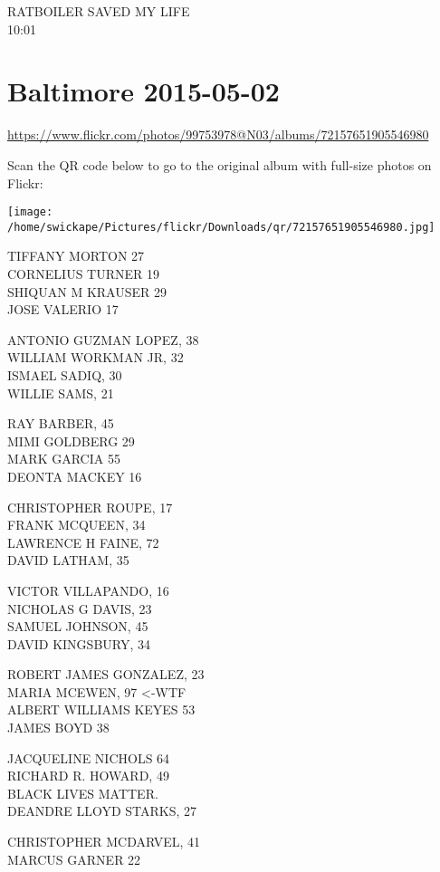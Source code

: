 \documentclass[10pt,letterpaper]{article}
\begin{document}
RATBOILER SAVED MY LIFE\\
10:01
\pagebreak

\section*{Baltimore 2015-05-02}

\url{https://www.flickr.com/photos/99753978@N03/albums/72157651905546980}

Scan the QR code below to go to the original album with full-size photos on Flickr:

\texttt{[image: /home/swickape/Pictures/flickr/Downloads/qr/72157651905546980.jpg]}
\pagebreak

TIFFANY MORTON 27\\
CORNELIUS TURNER 19\\
SHIQUAN M KRAUSER 29\\
JOSE VALERIO 17

ANTONIO GUZMAN LOPEZ, 38\\
WILLIAM WORKMAN JR, 32\\
ISMAEL SADIQ, 30\\
WILLIE SAMS, 21

RAY BARBER, 45\\
MIMI GOLDBERG 29\\
MARK GARCIA 55\\
DEONTA MACKEY 16

CHRISTOPHER ROUPE, 17\\
FRANK MCQUEEN, 34\\
LAWRENCE H FAINE, 72\\
DAVID LATHAM, 35

VICTOR VILLAPANDO, 16\\
NICHOLAS G DAVIS, 23\\
SAMUEL JOHNSON, 45\\
DAVID KINGSBURY, 34

ROBERT JAMES GONZALEZ, 23\\
MARIA MCEWEN, 97 <{-}WTF\\
ALBERT WILLIAMS KEYES 53\\
JAMES BOYD 38

JACQUELINE NICHOLS 64\\
RICHARD R. HOWARD, 49\\
BLACK LIVES MATTER.\\
DEANDRE LLOYD STARKS, 27

CHRISTOPHER MCDARVEL, 41\\
MARCUS GARNER 22
\end{document}
